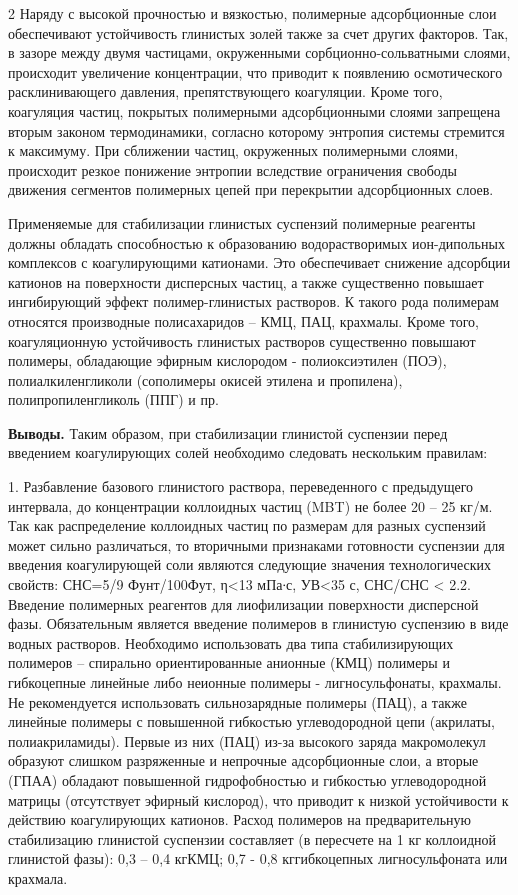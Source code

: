 \begin{multicols}{2}
Наряду с высокой прочностью и вязкостью, полимерные адсорбционные слои
обеспечивают устойчивость глинистых золей также за счет других факторов.
Так, в зазоре между двумя частицами, окруженными сорбционно-сольватными
слоями, происходит увеличение концентрации, что приводит к появлению
осмотического расклинивающего давления, препятствующего коагуляции.
Кроме того, коагуляция частиц, покрытых полимерными адсорбционными
слоями запрещена вторым законом термодинамики, согласно которому
энтропия системы стремится к максимуму. При сближении частиц, окруженных
полимерными слоями, происходит резкое понижение энтропии вследствие
ограничения свободы движения сегментов полимерных цепей при перекрытии
адсорбционных слоев.

Применяемые для стабилизации глинистых суспензий полимерные реагенты
должны обладать способностью к образованию водорастворимых ион-дипольных
комплексов с коагулирующими катионами. Это обеспечивает снижение
адсорбции катионов на поверхности дисперсных частиц, а также существенно
повышает ингибирующий эффект полимер-глинистых растворов. К такого рода
полимерам относятся производные полисахаридов -- КМЦ, ПАЦ, крахмалы.
Кроме того, коагуляционную устойчивость глинистых растворов существенно
повышают полимеры, обладающие эфирным кислородом - полиоксиэтилен (ПОЭ),
полиалкиленгликоли (сополимеры окисей этилена и пропилена),
полипропиленгликоль (ППГ) и пр.

{\bfseries Выводы.} Таким образом, при стабилизации глинистой суспензии
перед введением коагулирующих солей необходимо следовать нескольким
правилам:

1. Разбавление базового глинистого раствора, переведенного с предыдущего
интервала, до концентрации коллоидных частиц (MBT) не более 20 -- 25
кг/м. Так как распределение коллоидных частиц по
размерам для разных суспензий может сильно различаться, то вторичными
признаками готовности суспензии для введения коагулирующей соли являются
следующие значения технологических свойств: СНС=5/9
Фунт/100Фут, η<13 мПа∙с,
УВ<35 с, СНС/СНС <{}
2.2. Введение полимерных реагентов для лиофилизации поверхности дисперсной
фазы. Обязательным является введение полимеров в глинистую суспензию в
виде водных растворов. Необходимо использовать два типа стабилизирующих
полимеров -- спирально ориентированные анионные (КМЦ) полимеры и
гибкоцепные линейные либо неионные полимеры - лигносульфонаты, крахмалы.
Не рекомендуется использовать сильнозарядные полимеры (ПАЦ), а также
линейные полимеры с повышенной гибкостью углеводородной цепи (акрилаты,
полиакриламиды). Первые из них (ПАЦ) из-за высокого заряда макромолекул
образуют слишком разряженные и непрочные адсорбционные слои, а вторые
(ГПАА) обладают повышенной гидрофобностью и гибкостью углеводородной
матрицы (отсутствует эфирный кислород), что приводит к низкой
устойчивости к действию коагулирующих катионов. Расход полимеров на
предварительную стабилизацию глинистой суспензии составляет (в пересчете
на 1 кг коллоидной глинистой фазы): 0,3 -- 0,4 кгКМЦ; 0,7 - 0,8
кггибкоцепных лигносульфоната или крахмала.


\end{multicols}
